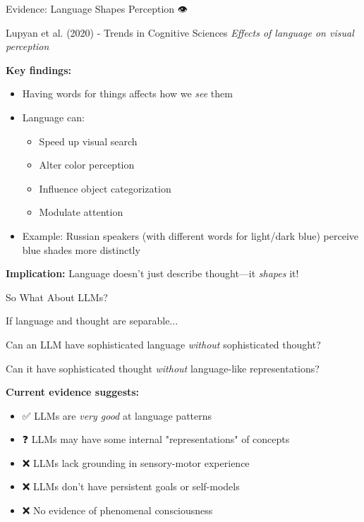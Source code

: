 \documentclass[aspectratio=169]{beamer}
\begin{document}
\begin{frame}[shrink=10]{Evidence: Language Shapes Perception 👁️}
\small
\begin{block}{Lupyan et al. (2020) - Trends in Cognitive Sciences}
\textit{Effects of language on visual perception}
\end{block}

\vspace{0.3cm}

\textbf{Key findings:}
\begin{itemize}\setlength{\itemsep}{0pt}
    \item Having words for things affects how we \textit{see} them
    \item Language can:
    \begin{itemize}\setlength{\itemsep}{0pt}
        \item Speed up visual search
        \item Alter color perception
        \item Influence object categorization
        \item Modulate attention
    \end{itemize}
    \item Example: Russian speakers (with different words for light/dark blue) perceive blue shades more distinctly
\end{itemize}

\vspace{0.3cm}

\textbf{Implication:} Language doesn't just describe thought—it \textit{shapes} it!
\end{frame}

\begin{frame}{So What About LLMs? 🤖}
\small
\begin{thinkaboutit}
If language and thought are separable...

Can an LLM have sophisticated language \textit{without} sophisticated thought?

Can it have sophisticated thought \textit{without} language-like representations?
\end{thinkaboutit}

\vspace{0.3cm}

\textbf{Current evidence suggests:}
\begin{itemize}\setlength{\itemsep}{0pt}
    \item ✅ LLMs are \textit{very good} at language patterns
    \item ❓ LLMs may have some internal "representations" of concepts
    \item ❌ LLMs lack grounding in sensory-motor experience
    \item ❌ LLMs don't have persistent goals or self-models
    \item ❌ No evidence of phenomenal consciousness
\end{itemize}
\end{frame}
\end{document}
